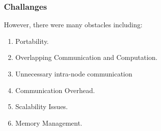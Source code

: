 \begin{frame}
  \frametitle{Challanges}
  However, there were many obstacles including:
  \begin{enumerate}
    \item Portability.
    \item Overlapping Communication and Computation.
    \item Unnecessary intra-node communication
    \item Communication Overhead.
    \item Scalability Issues.
    \item Memory Management.
  \end{enumerate}    
\end{frame}
